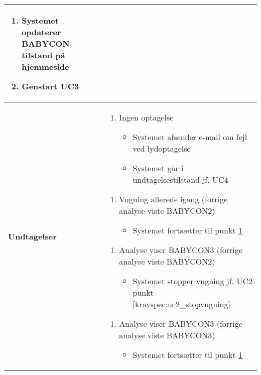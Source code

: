 \begin{center}
\begin{longtable}{|p{5cm}|p{9cm}|}
\begin{enumerate}
				\item \label{kravspec:uc3_opdatering}Systemet opdaterer BABYCON tilstand på hjemmeside 	
				\newline [Und: \ref{kravspec:uc3_opdatering}.a Ingen netværksforbindelse]			
				
				\item Genstart UC3				
				
			\end{enumerate}
		\\\hline
		\textbf{Undtagelser}
			&\begin{enumerate}[label=\ref{kravspec:uc3_optagelse}.a]
			\item Ingen optagelse
					\begin{itemize}
					\item Systemet afsender e-mail om fejl ved lydoptagelse
					\item Systemet går i undtagelsestilstand jf. UC4
					\end{itemize}
			\end{enumerate}
			\begin{enumerate}[label=\ref{kravspec:uc3_lydanalyse}.a]
			\item Vugning allerede igang (forrige analyse viste BABYCON2)
					\begin{itemize}
					\item Systemet fortsætter til punkt \ref{kravspec:uc3_opdatering}
					\end{itemize}
			\end{enumerate}
			\begin{enumerate}[label=\ref{kravspec:uc3_lydanalyse}.b]
			\item Analyse viser BABYCON3 (forrige analyse viste BABYCON2)
					\begin{itemize}
					\item Systemet stopper vugning jf. UC2 punkt \ref{kravspec:uc2_stopvugning}
					\end{itemize}
			\end{enumerate}
			\begin{enumerate}[label=\ref{kravspec:uc3_lydanalyse}.c]
			\item Analyse viser BABYCON3 (forrige analyse viste BABYCON3)
					\begin{itemize}
					\item Systemet fortsætter til punkt \ref{kravspec:uc3_opdatering}
					\end{itemize}
			\end{enumerate}
			\begin{enumerate}[label=\ref{kravspec:uc3_lydanalyse}.d]

\end{enumerate}
\end{longtable}
\end{center}
